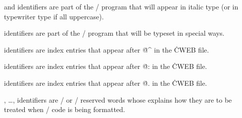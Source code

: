 \yskip\hang {} and  identifiers are part of
the
\CEE/ program that will  appear in italic type (or in typewriter type
if all uppercase).

\yskip\hang {} identifiers are part of the \CEE/ program that
will be typeset in special ways.

\yskip\hang {} identifiers are index entries that appear after
\.{@\^} in the \.{CWEB} file.

\yskip\hang {} identifiers are index entries that appear after
\.{@:} in the \.{CWEB} file.

\yskip\hang {} identifiers are index entries that appear after
\.{@.} in the \.{CWEB} file.

\yskip\hang {}, \dots, 
identifiers are \CEE/ or \CPLUSPLUS/ reserved words whose 
explains how they are to be treated when \CEE/ code is being
formatted.

